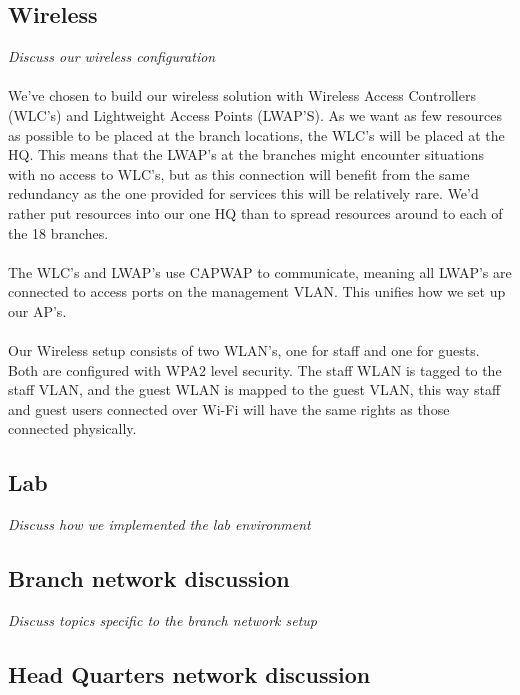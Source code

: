\subsection{Wireless}


\textit{Discuss our wireless configuration}
\\
\\
We've chosen to build our wireless solution with Wireless Access Controllers (WLC's) and Lightweight Access Points (LWAP'S). As we want as few resources as possible to be placed at the branch locations, the WLC's will be placed at the HQ. This means that the LWAP's at the branches might encounter situations with no access to WLC's, but as this connection will benefit from the same redundancy as the one provided for services this will be relatively rare. We'd rather put resources into our one HQ than to spread resources around to each of the 18 branches.
\\
\\
The WLC's and LWAP's use CAPWAP to communicate, meaning all LWAP's are connected to access ports on the management VLAN. This unifies how we set up our AP's.
\\
\\
Our Wireless setup consists of two WLAN's, one for staff and one for guests. Both are configured with WPA2 level security. The staff WLAN is tagged to the staff VLAN, and the guest WLAN is mapped to the guest VLAN, this way staff and guest users connected over Wi-Fi will have the same rights as those connected physically.

\subsection{Lab}

\textit{Discuss how we implemented the lab environment}

\subsection{Branch network discussion}

\textit{Discuss topics specific to the branch network setup}

\subsection{Head Quarters network discussion}

